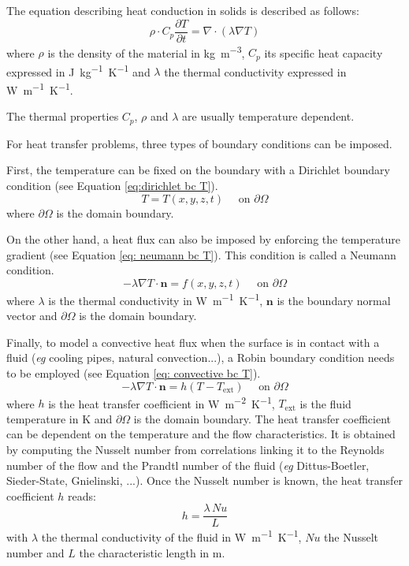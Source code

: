 The equation describing heat conduction in solids is described as follows:
\begin{equation}
    \rho \cdot C_p \frac{\partial T}{\partial t}=\nabla \cdot (\lambda \nabla T)
    \label{eq:heat equation}
\end{equation}
where $\rho$ is the density of the material in \si{kg.m^{-3}}, $C_p$ its specific heat capacity expressed in \si{J.kg^{-1}.K^{-1}} and $\lambda$ the thermal conductivity expressed in \si{W.m^{-1}.K^{-1}}.

The thermal properties $C_p$, $\rho$ and $\lambda$ are usually temperature dependent.

For heat transfer problems, three types of boundary conditions can be imposed.

First, the temperature can be fixed on the boundary with a Dirichlet boundary condition (see Equation \ref{eq:dirichlet bc T}).
\begin{equation}
    T = T(x, y, z, t) \quad \text { on } \partial \Omega
    \label{eq:dirichlet bc T}
\end{equation}
where $\partial \Omega$ is the domain boundary.

On the other hand, a heat flux can also be imposed by enforcing the temperature gradient (see Equation \ref{eq: neumann bc T}).
This condition is called a Neumann condition.
\begin{equation}
    -\lambda \nabla T \cdot \mathbf{n} = f(x, y, z, t) \quad \text { on } \partial \Omega
    \label{eq: neumann bc T}
\end{equation}
where $\lambda$ is the thermal conductivity in \si{W.m^{-1}.K^{-1}}, $\mathbf{n}$ is the boundary normal vector and $\partial \Omega$ is the domain boundary.

Finally, to model a convective heat flux when the surface is in contact with a fluid (\textit{eg} cooling pipes, natural convection...), a Robin boundary condition needs to be employed (see Equation \ref{eq: convective bc T}).
\begin{equation}
    -\lambda \nabla T \cdot \mathbf{n} = h (T - T_\mathrm{ext}) \quad \text { on } \partial \Omega
    \label{eq: convective bc T}
\end{equation}
where $h$ is the heat transfer coefficient in \si{W.m^{-2}.K^{-1}}, $T_\mathrm{ext}$ is the fluid temperature in \si{K} and $\partial \Omega$ is the domain boundary.
The heat transfer coefficient can be dependent on the temperature and the flow characteristics.
It is obtained by computing the Nusselt number from correlations linking it to the Reynolds number of the flow and the Prandtl number of the fluid  (\textit{eg} Dittus-Boetler, Sieder-State, Gnielinski, ...).
Once the Nusselt number is known, the heat transfer coefficient $h$ reads:
\begin{equation}
    h = \frac{\lambda \, \textit{Nu}}{L}
\end{equation}
with $\lambda$ the thermal conductivity of the fluid in \si{W.m^{-1}.K^{-1}}, $\textit{Nu}$ the Nusselt number and $L$ the characteristic length in \si{m}.


